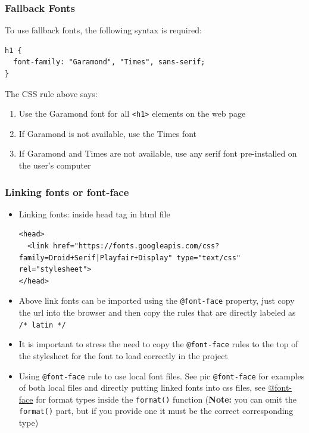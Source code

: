 \documentclass[a4paper, 12pt]{article}
\begin{document}
\subsubsection{Fallback Fonts}
To use fallback fonts, the following syntax is required:
\begin{verbatim}
h1 {
  font-family: "Garamond", "Times", sans-serif;
}
\end{verbatim}
The CSS rule above says:
\begin{enumerate}
\item Use the Garamond font for all \verb|<h1>| elements on the web page

\item If Garamond is not available, use the Times font

\item If Garamond and Times are not available, use any serif font pre-installed on the user's computer

\end{enumerate}

\subsubsection{Linking fonts or font-face}
\begin{itemize}
\item Linking fonts: inside head tag in html file
\begin{verbatim}
<head>
  <link href="https://fonts.googleapis.com/css?family=Droid+Serif|Playfair+Display" type="text/css" rel="stylesheet">
</head>
\end{verbatim}

\item Above link fonts can be imported using the \verb|@font-face| property, just copy the url into the browser and then copy the rules that are directly labeled as \verb|/* latin */|

\item It is important to stress the need to copy the \verb|@font-face| rules to the top of the stylesheet for the font to load correctly in the project

\item Using \verb|@font-face| rule to use local font files. See pic \verb|@font-face| for examples of both local files and directly putting linked fonts into css files, see \href{https://developer.mozilla.org/en-US/docs/Web/CSS/@font-face}{@font-face} for format types inside the \verb|format()| function (\textbf{Note:} you can omit the \verb|format()| part, but if you provide one it must be the correct corresponding type)
\end{itemize}
\end{document}
